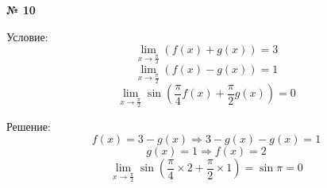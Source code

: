 \documentclass{article}
\begin{document}
\textbf{№ 10} 
\large

Условие:
$$ \lim\limits_{x \to \frac{\pi}{2}} \left( f(x) + g(x) \right) = 3 $$  
$$ \lim\limits_{x \to \frac{\pi}{2}} \left( f(x) - g(x) \right) = 1 $$  
$$ \lim\limits_{x \to \frac{\pi}{2}} \sin{\left( \frac{\pi}{4} f(x) + \frac{\pi}{2} g(x) \right)} = 0 $$ 

Решение:
$$ f(x) = 3 - g(x) \Rightarrow 3 - g(x) - g(x) = 1 $$
$$ g(x) = 1 \Rightarrow f(x) = 2 $$
$$ \lim\limits_{x \to \frac{\pi}{2}} \sin{\left( \frac{\pi}{4} \times 2 + \frac{\pi}{2} \times 1 \right)} 
= \sin{\pi}
= 0 $$
\end{document}
